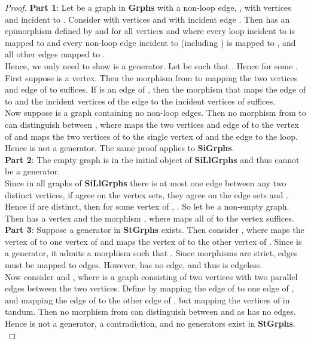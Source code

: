 \documentclass[11pt]{article}
\begin{document}
\begin{proof}
\textbf{Part 1}: Let  be a graph in \textbf{Grphs} with a non-loop edge, , with vertices  and  incident to . Consider  with vertices  and  with incident edge . Then  has an epimorphism  defined by  and  for all vertices  and where every loop incident to  is mapped to  and every non-loop edge incident to  (including ) is mapped to , and all other edges mapped to .\\
\indent Hence, we only need to show  is a generator. Let  be such that . Hence  for some . First suppose  is a vertex. Then the morphism  from  to  mapping the two vertices and edge of  to  suffices. If  is an edge of , then the morphism that maps the edge of  to  and the incident vertices of the edge to the incident vertices of  suffices.\\
\indent Now suppose  is a graph containing no non-loop edges. Then no morphism from  to  can distinguish between , where  maps the two vertices and edge of  to the vertex of  and  maps the two vertices of  to the single vertex of  and the edge to the loop. Hence  is not a generator. The same proof applies to \textbf{SiGrphs}.\\
\indent \textbf{Part 2}: The empty graph is in the initial object of \textbf{SiLlGrphs} and thus cannot be a generator.\\
\indent Since in all graphs of \textbf{SiLlGrphs} there is at most one edge between any two distinct vertices, if  agree on the vertex sets, they agree on the edge sets and . Hence if  are distinct, then for some vertex  of , . So let  be a non-empty graph. Then  has a vertex and the morphism , where  maps all of  to the vertex  suffices.\\
\indent \textbf{Part 3}: Suppose a generator  in \textbf{StGrphs} exists. Then consider , where  maps the vertex of  to one vertex of  and  maps the vertex of  to the other vertex of . Since  is a generator, it admits a morphism  such that . Since morphisms are strict, edges must be mapped to edges. However,  has no edge, and thus  is edgeless.\\
\indent Now consider  and  , where  is a graph consisting of two vertices with two parallel edges between the two vertices. Define  by  mapping the edge of  to one edge of , and  mapping the edge of  to the other edge of , but mapping the vertices of  in tandum. Then no morphism from  can distinguish between  and  as  has no edges. Hence  is not a generator, a contradiction, and no generators exist in \textbf{StGrphs}.\\

\end{proof}
\end{document}
